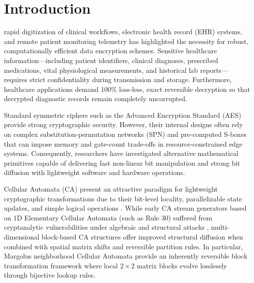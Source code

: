 \section{Introduction}
\label{sec:introduction}

 rapid digitization of clinical workflows, electronic health record (EHR) systems, and remote patient monitoring telemetry has highlighted the necessity for robust, computationally efficient data encryption schemes. Sensitive healthcare information—including patient identifiers, clinical diagnoses, prescribed medications, vital physiological measurements, and historical lab reports—requires strict confidentiality during transmission and storage. Furthermore, healthcare applications demand 100\% loss-less, exact reversible decryption so that decrypted diagnostic records remain completely uncorrupted.

Standard symmetric ciphers such as the Advanced Encryption Standard (AES) \cite{dworkin2007recommendation} provide strong cryptographic security. However, their internal designs often rely on complex substitution-permutation networks (SPN) and pre-computed S-boxes \cite{daemen2002design} that can impose memory and gate-count trade-offs in resource-constrained edge systems. Consequently, researchers have investigated alternative mathematical primitives capable of delivering fast non-linear bit manipulation and strong bit diffusion with lightweight software and hardware operations.

Cellular Automata (CA) present an attractive paradigm for lightweight cryptographic transformations due to their bit-level locality, parallelizable state updates, and simple logical operations \cite{wolfram1983statistical, wolfram1986random}. While early CA stream generators based on 1D Elementary Cellular Automata (such as Rule 30) suffered from cryptanalytic vulnerabilities under algebraic and structural attacks \cite{gutowitz1993cryptology, nandi2002theory}, multi-dimensional block-based CA structures offer improved structural diffusion when combined with spatial matrix shifts and reversible partition rules. In particular, Margolus neighborhood Cellular Automata provide an inherently reversible block transformation framework where local $2 \times 2$ matrix blocks evolve losslessly through bijective lookup rules.

